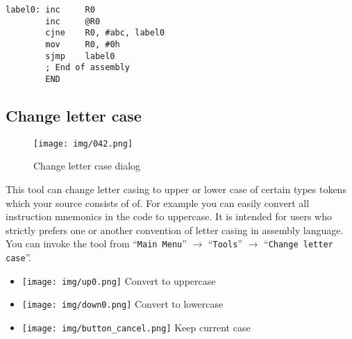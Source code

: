 \documentclass[a4paper,twoside,12pt]{book}
\newcommand{\menuitem}[1]{\texttt{#1}}
\begin{document}
\begin{minipage}{\textwidth}
\begin{minipage}[t]{.5\textwidth}
					{\color{highlight_label}\verb'label0:'}\verb' '{\color{highlight_instruction}\verb'inc'}\verb'     '{\color{highlight_sfr}\verb'R0'}\\
					\verb'        '{\color{highlight_instruction}\verb'inc'}\verb'     '{\color{highlight_indirect}\verb'@R0'}\\
					\verb'        '{\color{highlight_instruction}\verb'cjne'}\verb'    '{\color{highlight_sfr}\verb'R0'}{\color{highlight_oper_sep}\verb','}\verb' '{\color{highlight_imm_constant}\verb'#abc'}{\color{highlight_oper_sep}\verb','}\verb' '{\color{highlight_constant}\verb'label0'}\\
					\verb'        '{\color{highlight_instruction}\verb'mov'}\verb'     '{\color{highlight_sfr}\verb'R0'}{\color{highlight_oper_sep}\verb','}\verb' '{\color{highlight_imm_hex}\verb'#0h'}\\
					\verb'        '{\color{highlight_instruction}\verb'sjmp'}\verb'    '{\color{highlight_constant}\verb'label0'}\\
					\verb'        '{\color{highlight_comment}\verb'; End of assembly'}\\
					\verb'        '{\color{highlight_directive}\verb'END'}\\
				\end{minipage}
				\onecolumn
			\end{minipage}

		\subsection{Change letter case}
			\begin{wrapfigure}{r}{150pt}
				\centering{}
				\texttt{[image: img/042.png]}
				\caption{Change letter case dialog}
			\end{wrapfigure}
			This tool can change letter casing to upper or lower case of certain types tokens which your source consists of of. For example you can easily convert all instruction mnemonics in the code to uppercase. It is intended for users who strictly prefers one or another convention of letter casing in assembly language. You can invoke the tool from ``\menuitem{Main Menu}'' $\rightarrow$ ``\menuitem{Tools}'' $\rightarrow$ ``\menuitem{Change letter case}''.
			\begin{itemize}
				\setlength{\itemsep}{-3pt}
				\item \texttt{[image: img/up0.png]} Convert to uppercase
				\item \texttt{[image: img/down0.png]} Convert to lowercase
				\item \texttt{[image: img/button\_cancel.png]} Keep current case

			\end{itemize}
\end{document}
